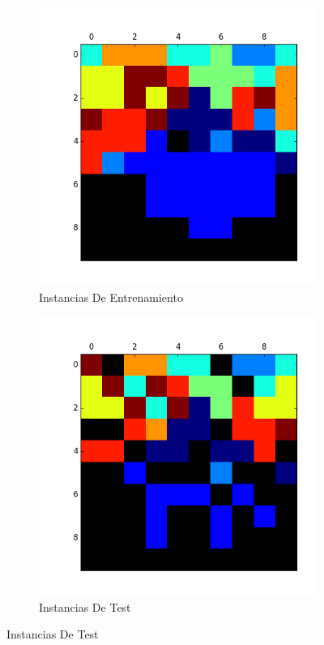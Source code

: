 \begin{figure}[h!]
\centering
\begin{subfigure}{.5\textwidth}
  \centering
  \includegraphics[width=.9\linewidth]{testeo_test_kohen/entrenamiento.png}
  \caption{Instancias De Entrenamiento}
  \label{fig:sub1}
\end{subfigure}%
\begin{subfigure}{.5\textwidth}
  \centering
  \includegraphics[width=.9\linewidth]{testeo_test_kohen/test.png}
  \caption{Instancias De Test}
  \label{fig:sub2}
\end{subfigure}
\label{fig:test}
\end{figure}

